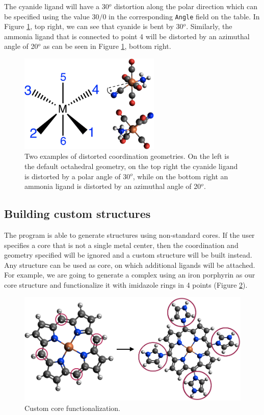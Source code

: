 \documentclass[a4paper,12pt]{assignment}
\begin{document}
The cyanide ligand will have a 30$^o$ distortion along the polar direction which can be specified using the value $30/0$ in the corresponding \texttt{Angle} field on the table. In Figure \ref{lang2}, top right, we can see that cyanide is bent by 30$^o$. Similarly, the ammonia ligand that is connected to point 4 will be distorted by an azimuthal angle of 20$^o$ as can be seen in Figure \ref{lang2}, bottom right.

\begin{figure}[htb!]
\centering
\includegraphics[width=0.6\textwidth]{./Figures/fig13b.png}
\caption{Two examples of distorted coordination geometries. On the left is the default octahedral geometry, on the top right the cyanide ligand is distorted by a polar angle of 30$^o$, while on the bottom right an ammonia ligand is distorted by an azimuthal angle of 20$^o$.}
\label{lang2}
\end{figure}

\subsection{Building custom structures}

The program is able to generate structures using non-standard cores. If the user specifies a core that is not a single metal center, then the coordination and geometry specified will be ignored and a custom structure will be built instead. Any structure can be used as core, on which additional ligands will be attached. For example, we are going to generate a complex using an iron porphyrin as our core structure and functionalize it with imidazole rings in 4 points (Figure \ref{custom0}).  

\begin{figure}[htb!]
\centering
\includegraphics[width=\textwidth]{./Figures/fig4a.png}
\caption{Custom core functionalization.}
\label{custom0}
\end{figure}
\end{document}
